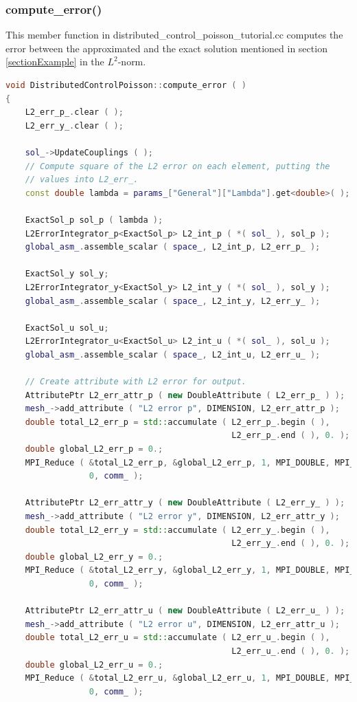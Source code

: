 \documentclass[a4paper, 11pt, twoside]{article}
\begin{document}
\subsubsection{compute\_error()}\label{memberComputeError}
This member function in distributed\_control\_poisson\_tutorial.cc computes the error between the approximated and the exact solution mentioned in section \ref{sectionExample} in the $L^2$-norm.

\begin{lstlisting}[language=C++, basicstyle={\footnotesize, \ttfamily}, keywordstyle=\color{blue}, numbers=none, tabsize=4]
void DistributedControlPoisson::compute_error ( )
{
    L2_err_p_.clear ( );
    L2_err_y_.clear ( );

    sol_->UpdateCouplings ( );
    // Compute square of the L2 error on each element, putting the
    // values into L2_err_.
    const double lambda = params_["General"]["Lambda"].get<double>( );

    ExactSol_p sol_p ( lambda );
    L2ErrorIntegrator_p<ExactSol_p> L2_int_p ( *( sol_ ), sol_p );
    global_asm_.assemble_scalar ( space_, L2_int_p, L2_err_p_ );

    ExactSol_y sol_y;
    L2ErrorIntegrator_y<ExactSol_y> L2_int_y ( *( sol_ ), sol_y );
    global_asm_.assemble_scalar ( space_, L2_int_y, L2_err_y_ );

    ExactSol_u sol_u;
    L2ErrorIntegrator_u<ExactSol_u> L2_int_u ( *( sol_ ), sol_u );
    global_asm_.assemble_scalar ( space_, L2_int_u, L2_err_u_ );

    // Create attribute with L2 error for output.
    AttributePtr L2_err_attr_p ( new DoubleAttribute ( L2_err_p_ ) );
    mesh_->add_attribute ( "L2 error p", DIMENSION, L2_err_attr_p );
    double total_L2_err_p = std::accumulate ( L2_err_p_.begin ( ), 
                                              L2_err_p_.end ( ), 0. );
    double global_L2_err_p = 0.;
    MPI_Reduce ( &total_L2_err_p, &global_L2_err_p, 1, MPI_DOUBLE, MPI_SUM, 
                 0, comm_ );

    AttributePtr L2_err_attr_y ( new DoubleAttribute ( L2_err_y_ ) );
    mesh_->add_attribute ( "L2 error y", DIMENSION, L2_err_attr_y );
    double total_L2_err_y = std::accumulate ( L2_err_y_.begin ( ), 
                                              L2_err_y_.end ( ), 0. );
    double global_L2_err_y = 0.;
    MPI_Reduce ( &total_L2_err_y, &global_L2_err_y, 1, MPI_DOUBLE, MPI_SUM, 
                 0, comm_ );

    AttributePtr L2_err_attr_u ( new DoubleAttribute ( L2_err_u_ ) );
    mesh_->add_attribute ( "L2 error u", DIMENSION, L2_err_attr_u );
    double total_L2_err_u = std::accumulate ( L2_err_u_.begin ( ), 
                                              L2_err_u_.end ( ), 0. );
    double global_L2_err_u = 0.;
    MPI_Reduce ( &total_L2_err_u, &global_L2_err_u, 1, MPI_DOUBLE, MPI_SUM, 
                 0, comm_ );


\end{lstlisting}
\end{document}

